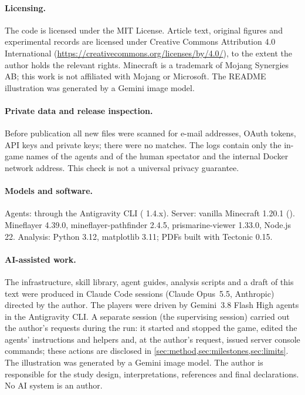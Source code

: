 \documentclass[11pt]{article}
\begin{document}
\paragraph{Licensing.} The code is licensed under the MIT License. Article text, original figures and experimental records are licensed under Creative Commons Attribution 4.0 International (\url{https://creativecommons.org/licenses/by/4.0/}), to the extent the author holds the relevant rights. Minecraft is a trademark of Mojang Synergies AB; this work is not affiliated with Mojang or Microsoft. The README illustration was generated by a Gemini image model.

\paragraph{Private data and release inspection.} Before publication all new files were scanned for e-mail addresses, OAuth tokens, API keys and private keys; there were no matches. The logs contain only the in-game names of the agents and of the human spectator and the internal Docker network address. This check is not a universal privacy guarantee.

\paragraph{Models and software.} Agents:  through the Antigravity CLI ( 1.4.x). Server: vanilla Minecraft 1.20.1 (). Mineflayer 4.39.0, mineflayer-pathfinder 2.4.5, prismarine-viewer 1.33.0, Node.js 22. Analysis: Python 3.12, matplotlib 3.11; PDFs built with Tectonic 0.15.

\paragraph{AI-assisted work.} The infrastructure, skill library, agent guides, analysis scripts and a draft of this text were produced in Claude Code sessions (Claude Opus~5.5, Anthropic) directed by the author. The players were driven by Gemini~3.8 Flash High agents in the Antigravity CLI. A separate  session (the supervising session) carried out the author's requests during the run: it started and stopped the game, edited the agents' instructions and helpers and, at the author's request, issued server console commands; these actions are disclosed in \cref{sec:method,sec:milestones,sec:limits}. The illustration was generated by a Gemini image model. The author is responsible for the study design, interpretations, references and final declarations. No AI system is an author.
\end{document}
